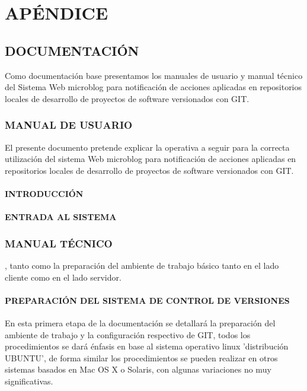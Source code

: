 

%
\chapter{APÉNDICE}
\section{DOCUMENTACIÓN}
Como documentación base presentamos los manuales de usuario y manual técnico del Sistema Web microblog para notificación de acciones aplicadas en repositorios locales de desarrollo de proyectos de software versionados con GIT. 
\subsection{MANUAL DE USUARIO}
El presente documento pretende explicar la operativa a seguir para la correcta utilización del sistema Web microblog para notificación de acciones aplicadas en repositorios locales de desarrollo de proyectos de software versionados con GIT.
\subsubsection{INTRODUCCIÓN}
\subsubsection{ENTRADA AL SISTEMA}

\subsection{MANUAL TÉCNICO}
, tanto como la preparación del ambiente de trabajo básico tanto en el lado cliente como en el lado servidor.
\subsubsection{PREPARACIÓN DEL SISTEMA DE CONTROL DE VERSIONES}

En esta primera etapa de la documentación se detallará la preparación del ambiente de trabajo y la configuración respectivo de GIT, todos los procedimientos se dará énfasis en base al sistema operativo linux  'distribución UBUNTU', de forma similar los procedimientos se pueden realizar en otros sistemas basados en Mac OS X o Solaris, con algunas variaciones no muy significativas.


